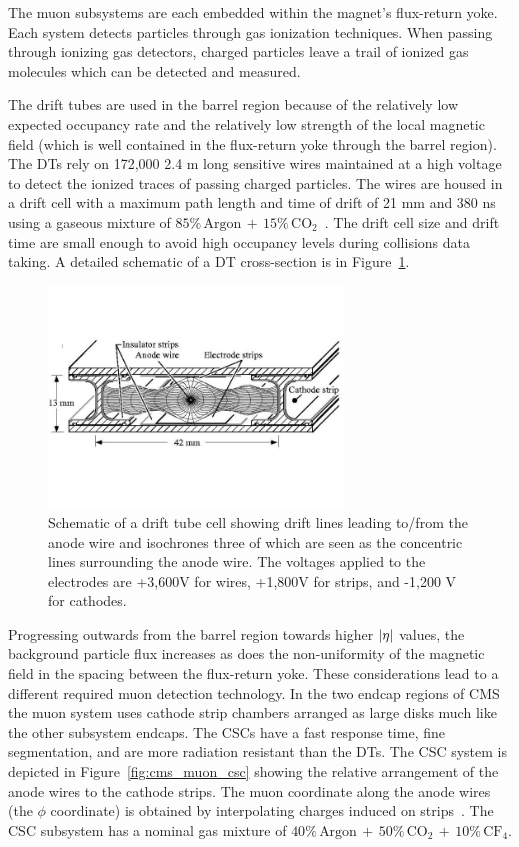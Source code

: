 The muon subsystems are each embedded within the magnet's flux-return yoke. Each system
detects particles through gas ionization techniques. 
When passing through ionizing gas detectors, charged particles leave a trail of ionized gas 
molecules which can be detected and measured.

The drift tubes are used in the barrel region
because of the relatively low expected occupancy rate and the relatively low strength of the local
magnetic field (which is well contained in the flux-return yoke through the barrel region).
The DTs rely on 172,000 2.4 m long sensitive wires maintained at a high voltage to detect the ionized traces
of passing charged particles. The wires are housed in a drift cell with a maximum path length
and time of drift of 21 mm and 380 ns using a gaseous mixture of 
$85\% \, \textrm{Argon} \, + \, 15\% \, \textrm{CO}_{2}$~\cite{CMS-Proposal}. The drift cell size and drift
time are small enough to avoid high occupancy levels during collisions data taking.
A detailed schematic of a DT cross-section is in Figure~\ref{fig:cms_muon_dt}.

\begin{figure}[htbp]
\centering
     \includegraphics[width=0.7\textwidth]{cms_and_lhc/plots/cms_muon_dt.jpg}
     \caption{
Schematic of a drift tube cell showing drift lines leading to/from the anode wire 
and isochrones three of which are seen as the concentric lines surrounding the 
anode wire. The voltages applied to the 
electrodes are +3,600V for wires, +1,800V for strips, and -1,200 V for cathodes.
     }
     \label{fig:cms_muon_dt}
\end{figure}

Progressing outwards from the barrel region towards higher $\lvert\eta\rvert$ values, the background 
particle flux increases as does the non-uniformity of the magnetic field in the spacing between
the flux-return yoke. These considerations lead to a different required muon detection technology.
In the two endcap regions of CMS the muon system uses cathode strip chambers arranged as large
disks much like the other subsystem endcaps. The CSCs have a fast 
response time, fine segmentation, and are more radiation resistant than the DTs. The CSC system
is depicted in Figure~\ref{fig:cms_muon_csc} showing the relative arrangement of the anode
wires to the cathode strips. The muon coordinate along the anode wires (the $\phi$ coordinate) 
is obtained by interpolating charges induced on strips~\cite{cms_csc_gas}.
The CSC subsystem has a nominal gas mixture of 
$40\% \, \textrm{Argon} \, + \, 50\% \, \textrm{CO}_{2} \, + \, 10\% \, \textrm{CF}_{4}$.


